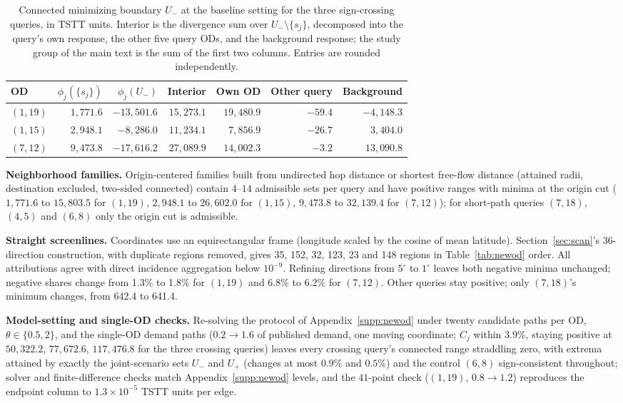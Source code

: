 \begin{table}[pos=tbh]
\footnotesize
\caption{Connected minimizing boundary $U_-$ at the baseline setting
for the three sign-crossing queries, in TSTT units. Interior is the
divergence sum over $U_-\setminus\{s_j\}$, decomposed into the query's
own response, the other five query ODs, and the background response;
the study group of the main text is the sum of the first two columns.
Entries are rounded independently.}
\label{tab:negmech}
\small
\begin{tabular*}{\tblwidth}{@{\extracolsep{\fill}}lrrrrrr}
\toprule
OD & $\phi_j(\{s_j\})$ & $\phi_j(U_-)$ & Interior & Own OD & Other query & Background\\
\midrule
$(1,19)$ & $1{,}771.6$ & $-13{,}501.6$ & $15{,}273.1$ & $19{,}480.9$ & $-59.4$ & $-4{,}148.3$ \\
$(1,15)$ & $2{,}948.1$ & $-8{,}286.0$ & $11{,}234.1$ & $7{,}856.9$ & $-26.7$ & $3{,}404.0$ \\
$(7,12)$ & $9{,}473.8$ & $-17{,}616.2$ & $27{,}089.9$ & $14{,}002.3$ & $-3.2$ & $13{,}090.8$ \\
\bottomrule
\end{tabular*}
\end{table}

\textbf{Neighborhood families.}
Origin-centered families built from undirected hop distance or
shortest free-flow distance (attained radii, destination excluded,
two-sided connected) contain $4$--$14$ admissible sets per query and
have positive ranges with minima at the origin cut ($1{,}771.6$ to
$15{,}803.5$ for $(1,19)$, $2{,}948.1$ to $26{,}602.0$ for $(1,15)$,
$9{,}473.8$ to $32{,}139.4$ for $(7,12)$); for short-path queries
$(7,18)$, $(4,5)$ and $(6,8)$ only the origin cut is admissible.

\textbf{Straight screenlines.}
Coordinates use an equirectangular frame (longitude scaled by the cosine
of mean latitude). Section~\ref{sec:scan}'s 36-direction construction,
with duplicate regions removed, gives 35, 152, 32, 123, 23 and 148
regions in Table~\ref{tab:newod} order. All attributions agree with direct
incidence aggregation below $10^{-9}$. Refining directions from
$5^\circ$ to $1^\circ$ leaves both negative minima unchanged; negative
shares change from 1.3\% to 1.8\% for $(1,19)$ and 6.8\% to 6.2\%
for $(7,12)$. Other queries stay positive; only $(7,18)$'s minimum
changes, from 642.4 to 641.4.

\textbf{Model-setting and single-OD checks.}
Re-solving the protocol of Appendix~\ref{supp:newod} under twenty
candidate paths per OD, $\theta\in\{0.5,2\}$, and the single-OD
demand paths ($0.2\to1.6$ of published demand, one moving coordinate;
$C_j$ within $3.9\%$, staying positive at $50{,}322.2$,
$77{,}672.6$, $117{,}476.8$ for the three crossing queries) leaves
every crossing query's connected range straddling zero, with extrema
attained by exactly the joint-scenario sets $U_-$ and $U_+$ (changes
at most $0.9\%$ and $0.5\%$) and the control $(6,8)$
sign-consistent throughout; solver and finite-difference checks match
Appendix~\ref{supp:newod} levels, and the $41$-point check ($(1,19)$,
$0.8\to1.2$) reproduces the endpoint column to $1.3\times10^{-5}$
TSTT units per edge.

